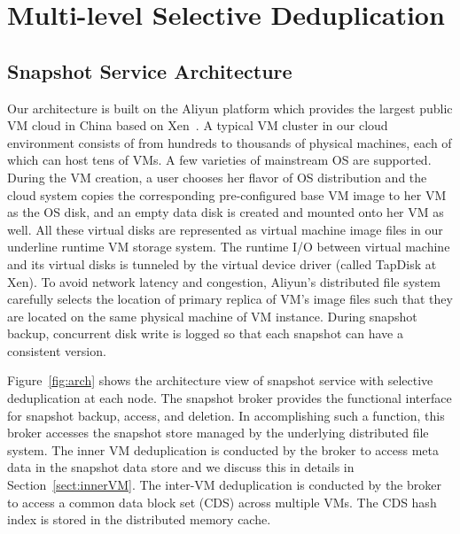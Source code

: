 \section{Multi-level Selective Deduplication}
\label{sect:arch}

\subsection{Snapshot Service Architecture}
Our architecture is built on the Aliyun platform which provides the largest public VM cloud in China 
based on Xen~\cite{Xen2003}. A typical VM cluster in our cloud environment
consists of from hundreds to thousands of physical machines, each of which can
host tens of VMs. A few varieties of mainstream OS are supported.
During the VM creation, a user chooses her flavor of OS distribution and the cloud system 
copies the corresponding pre-configured base VM image to her VM as the OS disk, 
and an empty data disk is created and mounted onto her VM as well. 
All these virtual disks are represented as virtual machine image files in our
underline runtime VM storage system. The runtime I/O between virtual machine and its virtual
disks is tunneled by the virtual device driver (called TapDisk at Xen). To avoid network latency and congestion, 
Aliyun's distributed file system carefully selects the location of primary replica of VM's 
image files such that they are located on the same physical machine of VM instance.
During snapshot backup, concurrent disk write is logged 
so that each snapshot can have a   consistent version.

Figure~\ref{fig:arch} shows the architecture view of snapshot service with selective deduplication
at each node. The  snapshot broker provides the functional interface for  snapshot backup, access, and deletion.
In accomplishing such a function, this broker accesses  the snapshot store managed by the underlying distributed file
system.  The inner VM  deduplication is conducted by the broker to access meta data in the snapshot data store
and we discuss this in details in Section~\ref{sect:innerVM}.
The inter-VM deduplication is conducted by the broker to access a  common data block set (CDS) across multiple VMs.
The CDS hash index is stored in the distributed memory cache. 

